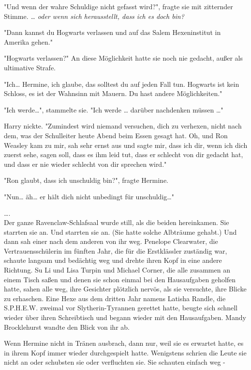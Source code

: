 {"Und wenn der wahre Schuldige nicht gefasst wird?", fragte sie mit zitternder Stimme. \emph{… oder wenn sich herausstellt, dass ich es doch bin?}

"Dann kannst du Hogwarts verlassen und auf das Salem Hexeninstitut in Amerika gehen."

"Hogwarts verlassen?" An diese Möglichkeit hatte sie noch nie gedacht, außer als ultimative Strafe.

"Ich… Hermine, ich glaube, das solltest du auf jeden Fall tun. Hogwarts ist kein Schloss, es ist der Wahnsinn mit Mauern. Du hast andere Möglichkeiten."

"Ich werde…", stammelte sie. "Ich werde … darüber nachdenken müssen …"

Harry nickte. "Zumindest wird niemand versuchen, dich zu verhexen, nicht nach dem, was der Schulleiter heute Abend beim Essen gesagt hat. Oh, und Ron Weasley kam zu mir, sah sehr ernst aus und sagte mir, dass ich dir, wenn ich dich zuerst sehe, sagen soll, dass es ihm leid tut, dass er schlecht von dir gedacht hat, und dass er nie wieder schlecht von dir sprechen wird."

"Ron glaubt, dass ich unschuldig bin?", fragte Hermine.

"Nun… äh… er hält dich nicht unbedingt für unschuldig…"

….\\ Der ganze Ravenclaw-Schlafsaal wurde still, als die beiden hereinkamen. Sie starrten sie an. Und starrten sie an. (Sie hatte solche Albträume gehabt.) Und dann sah einer nach dem anderen von ihr weg. Penelope Clearwater, die Vertrauensschülerin im fünften Jahr, die für die Erstklässler zuständig war, schaute langsam und bedächtig weg und drehte ihren Kopf in eine andere Richtung. Su Li und Lisa Turpin und Michael Corner, die alle zusammen an einem Tisch saßen und denen sie schon einmal bei den Hausaufgaben geholfen hatte, sahen alle weg, ihre Gesichter plötzlich nervös, als sie versuchte, ihre Blicke zu erhaschen. Eine Hexe aus dem dritten Jahr namens Latisha Randle, die S.P.H.E.W. zweimal vor Slytherin-Tyrannen gerettet hatte, beugte sich schnell wieder über ihren Schreibtisch und begann wieder mit den Hausaufgaben. Mandy Brocklehurst wandte den Blick von ihr ab.

Wenn Hermine nicht in Tränen ausbrach, dann nur, weil sie es erwartet hatte, es in ihrem Kopf immer wieder durchgespielt hatte. Wenigstens schrien die Leute sie nicht an oder schubsten sie oder verfluchten sie. Sie schauten einfach weg -

}
